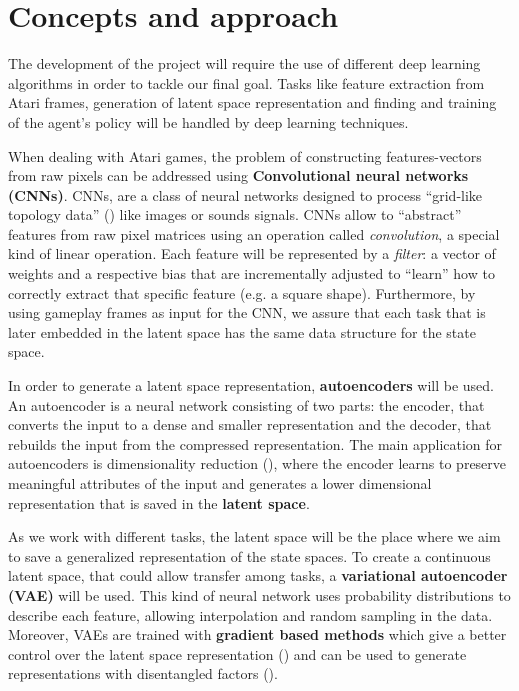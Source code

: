 \section{Concepts and approach}

The development of the project will require the use of different deep learning algorithms in order to tackle our final goal. Tasks like feature extraction from Atari frames, generation of latent space representation and finding and training of the agent's policy will be handled by deep learning techniques.

When dealing with Atari games, the problem of constructing features-vectors from raw pixels can be addressed using \textbf{Convolutional neural networks (CNNs)}.
CNNs, are a class of neural networks designed to process ``grid-like topology data'' (\cite{goodfellow2016deep}) like images or sounds signals. CNNs allow to ``abstract'' features from raw pixel matrices using an operation called \textit{convolution}, a special kind of linear operation. Each feature will be represented by a \textit{filter}: a vector of weights and a respective bias that are incrementally adjusted to ``learn'' how to correctly extract that specific feature (e.g. a square shape). 
Furthermore, by using gameplay frames as input for the CNN, we assure that each task that is later embedded in the latent space has the same data structure for the state space.  

In order to generate a latent space representation, \textbf{autoencoders} will be used. An autoencoder is a neural network consisting of two parts: the encoder, that converts the input to a dense and smaller representation and the decoder, that rebuilds the input from the compressed representation. The main application for autoencoders is dimensionality reduction (\cite{Hinton504}), where the encoder learns to preserve meaningful attributes of the input and generates a lower dimensional representation that is saved in the \textbf{latent space}. 

As we work with different tasks, the latent space will be the place where we aim to save a generalized representation of the state spaces. To create a continuous latent space, that could allow transfer among tasks, a \textbf{variational autoencoder (VAE)} will be used. This kind of neural network uses probability distributions to describe each feature, allowing interpolation and random sampling in the data. Moreover, VAEs are trained with \textbf{gradient based methods} which give a better control over the latent space representation (\cite{goodfellow2016deep}) and can be used to generate representations with disentangled factors (\cite{2016arXiv160605579H}).

